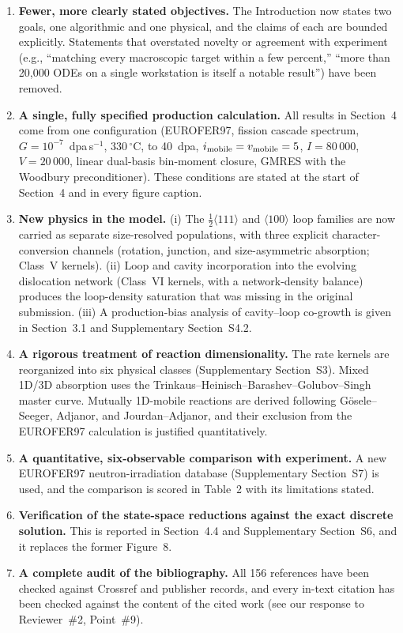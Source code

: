 \documentclass{article}
\newcommand{\hkl}[1]{\langle #1\rangle}
\newcommand{\half}{\tfrac{1}{2}}
\newcommand{\imob}{i_{\rm mobile}}
\newcommand{\vmob}{v_{\rm mobile}}
\begin{document}
\begin{enumerate}[leftmargin=*]
    \item \textbf{Fewer, more clearly stated objectives.} The Introduction now states two goals, one algorithmic and one physical, and the claims of each are bounded explicitly. Statements that overstated novelty or agreement with experiment (e.g., ``matching every macroscopic target within a few percent,'' ``more than 20{,}000 ODEs on a single workstation is itself a notable result'') have been removed.
    \item \textbf{A single, fully specified production calculation.} All results in Section~4 come from one configuration (EUROFER97, fission cascade spectrum, $G=10^{-7}$~dpa\,s$^{-1}$, $330\,^\circ$C, to 40~dpa, $\imob=\vmob=5$, $I=80\,000$, $V=20\,000$, linear dual-basis bin-moment closure, GMRES with the Woodbury preconditioner). These conditions are stated at the start of Section~4 and in every figure caption.
    \item \textbf{New physics in the model.} (i) The $\half\hkl{111}$ and $\hkl{100}$ loop families are now carried as separate size-resolved populations, with three explicit character-conversion channels (rotation, junction, and size-asymmetric absorption; Class~V kernels). (ii) Loop and cavity incorporation into the evolving dislocation network (Class~VI kernels, with a network-density balance) produces the loop-density saturation that was missing in the original submission. (iii) A production-bias analysis of cavity--loop co-growth is given in Section~3.1 and Supplementary Section~S4.2.
    \item \textbf{A rigorous treatment of reaction dimensionality.} The rate kernels are reorganized into six physical classes (Supplementary Section~S3). Mixed 1D/3D absorption uses the Trinkaus--Heinisch--Barashev--Golubov--Singh master curve. Mutually 1D-mobile reactions are derived following Gösele--Seeger, Adjanor, and Jourdan--Adjanor, and their exclusion from the EUROFER97 calculation is justified quantitatively.
    \item \textbf{A quantitative, six-observable comparison with experiment.} A new EUROFER97 neutron-irradiation database (Supplementary Section~S7) is used, and the comparison is scored in Table~2 with its limitations stated.
    \item \textbf{Verification of the state-space reductions against the exact discrete solution.} This is reported in Section~4.4 and Supplementary Section~S6, and it replaces the former Figure~8.
    \item \textbf{A complete audit of the bibliography.} All 156 references have been checked against Crossref and publisher records, and every in-text citation has been checked against the content of the cited work (see our response to Reviewer~\#2, Point~\#9).
\end{enumerate}
\end{document}
